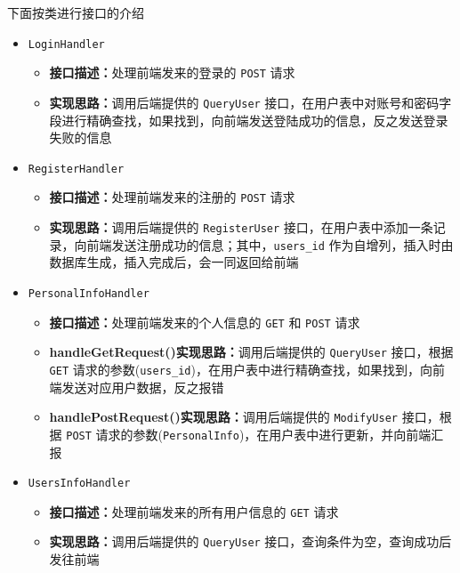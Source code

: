\documentclass[12pt,a4paper,UTF8]{article}
\begin{document}
下面按类进行接口的介绍

\begin{itemize}

  \item \verb|LoginHandler|
  \begin{itemize}
  \item \textbf{接口描述：}处理前端发来的登录的 \verb|POST| 请求
  \item \textbf{实现思路：}调用后端提供的 \verb|QueryUser| 接口，在用户表中对账号和密码字段进行精确查找，如果找到，向前端发送登陆成功的信息，反之发送登录失败的信息
  \end{itemize}

  \item \verb|RegisterHandler|
  \begin{itemize}
  \item \textbf{接口描述：}处理前端发来的注册的 \verb|POST| 请求
  \item \textbf{实现思路：}调用后端提供的 \verb|RegisterUser| 接口，在用户表中添加一条记录，向前端发送注册成功的信息；其中，\verb|users_id| 作为自增列，插入时由数据库生成，插入完成后，会一同返回给前端
  \end{itemize}

  \item \verb|PersonalInfoHandler|
  \begin{itemize}
  \item \textbf{接口描述：}处理前端发来的个人信息的 \verb|GET| 和 \verb|POST| 请求
  \item \textbf{handleGetRequest()实现思路：}调用后端提供的 \verb|QueryUser| 接口，根据 \verb|GET| 请求的参数(\verb|users_id|)，在用户表中进行精确查找，如果找到，向前端发送对应用户数据，反之报错
  \item \textbf{handlePostRequest()实现思路：}调用后端提供的 \verb|ModifyUser| 接口，根据 \verb|POST| 请求的参数(\verb|PersonalInfo|)，在用户表中进行更新，并向前端汇报
  \end{itemize}

  \item \verb|UsersInfoHandler|
  \begin{itemize}
  \item \textbf{接口描述：}处理前端发来的所有用户信息的 \verb|GET| 请求
  \item \textbf{实现思路：}调用后端提供的 \verb|QueryUser| 接口，查询条件为空，查询成功后发往前端
  \end{itemize}


\end{itemize}
\end{document}
